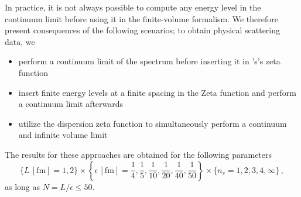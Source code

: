 In practice, it is not always possible to compute any energy level in the continuum limit before using it in the finite-volume \Luscher formalism.
We therefore present consequences of the following scenarios; to obtain physical scattering data, we
\begin{itemize}
	\item perform a continuum limit of the spectrum before inserting it in \Luscher's's zeta function
	\item insert finite energy levels at a finite spacing in the Zeta function and perform a continuum limit afterwards
	\item utilize the dispersion zeta function to simultaneously perform a continuum and infinite volume limit
\end{itemize}
The results for these approaches are obtained for the following parameters
\begin{equation}
    \{ L \,[\mathrm{fm}]= 1, 2 \}
    \times \left\{ \epsilon \,[\mathrm{fm}] = \frac{1}{4}, \frac{1}{5}, \frac{1}{10}, \frac{1}{20}, \frac{1}{40}, \frac{1}{50} \right\}
    \times \{ n_s = 1, 2, 3, 4, \infty \}
    \, ,
\end{equation}
as long as $N = L / \epsilon \leq 50$.




